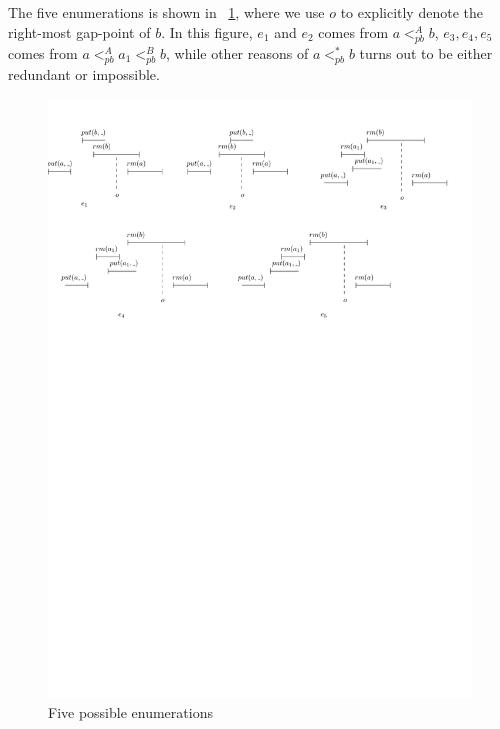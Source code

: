 The five enumerations is shown in \figurename~\ref{fig:five enumerations}, where we use $o$ to explicitly denote the right-most gap-point of $b$. In this figure, $e_1$ and $e_2$ comes from $a <_{\textit{pb}}^A b$, $e_3,e_4,e_5$ comes from $a <_{\textit{pb}}^A a_1 <_{\textit{pb}}^B b$, while other reasons of $a <_{\textit{pb}}^* b$ turns out to be either redundant or impossible.

\begin{figure}[htbp]
  \centering
  \includegraphics[width=1 \textwidth]{figures/PIC-HIS-FiveEnumerations.pdf}
  \caption{Five possible enumerations}
  \label{fig:five enumerations}
\end{figure}

